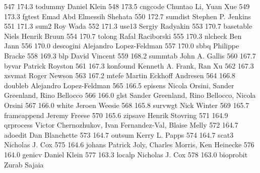    547    174.3    todummy       Daniel Klein                            
   548    173.5    cngcode       Chuntao Li, Yuan Xue                    
   549    173.3    fgtest        Emad Abd Elmessih Shehata               
   550    172.7    sumdist       Stephen P. Jenkins                      
   551    171.3    sum2          Roy Wada                                
   552    171.3    use13         Sergiy Radyakin                         
   553    170.7    basetable     Niels Henrik Bruun                      
   554    170.7    tolong        Rafal Raciborski                        
   555    170.3    nlcheck       Ben Jann                                
   556    170.0    descogini     Alejandro Lopez-Feldman                 
   557    170.0    sbbq          Philippe Bracke                         
   558    169.3    blp           David Vincent                           
   559    168.2    summtab       John A. Gallis                          
   560    167.7    byvar         Patrick Royston                         
   561    167.3    konfound      Kenneth A. Frank, Ran Xu                
   562    167.3    xsvmat        Roger Newson                            
   563    167.2    mtefe         Martin Eckhoff Andresen                 
   564    166.8    doubleb       Alejandro Lopez-Feldman                 
   565    166.5    episens       Nicola Orsini, Sander Greenland, Rino   
                                   Bellocco                                
   566    166.0    glst          Sander Greenland, Rino Bellocco, Nicola 
                                   Orsini                                  
   567    166.0    white         Jeroen Weesie                           
   568    165.8    survwgt       Nick Winter                             
   569    165.7    frameappend   Jeremy Freese                           
   570    165.6    zipsave       Henrik Stovring                         
   571    164.9    qrprocess     Victor Chernozhukov, Ivan               
                                   Fernandez-Val, Blaise Melly             
   572    164.7    adoedit       Dan Blanchette                          
   573    164.7    outsum        Kerry L. Papps                          
   574    164.7    scat3         Nicholas J. Cox                         
   575    164.6    johans        Patrick Joly, Charles Morris, Ken       
                                   Heinecke                                
   576    164.0    genicv        Daniel Klein                            
   577    163.3    localp        Nicholas J. Cox                         
   578    163.0    bioprobit     Zurab Sajaia                            
